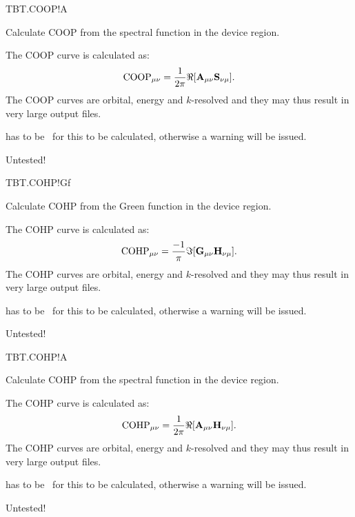 \begin{fdflogicalF}{TBT.COOP!A}

  Calculate COOP from the spectral function in the device region.

  The COOP curve is calculated as:
  \begin{equation}
    \label{eq:COOP-A}
    \mathrm{COOP}_{\mu\nu} = \frac{1}{2\pi}\Re[\mathbf A_{\mu\nu} \mathbf{S}_{\nu\mu}].
  \end{equation}
  The COOP curves are orbital, energy and $k$-resolved and they may
  thus result in very large output files.

  \note {} has to be \fdftrue\ for this to be
  calculated, otherwise a warning will be issued.

  \note Untested!

\end{fdflogicalF}

\begin{fdflogicalF}{TBT.COHP!Gf}

  Calculate COHP from the Green function in the device region.

  The COHP curve is calculated as:
  \begin{equation}
    \label{eq:COHP-Gf}
    \mathrm{COHP}_{\mu\nu} = \frac{-1}\pi\Im[\mathbf G_{\mu\nu} \mathbf{H}_{\nu\mu}].
  \end{equation}
  The COHP curves are orbital, energy and $k$-resolved and they may
  thus result in very large output files.

  \note {} has to be \fdftrue\ for this to be
  calculated, otherwise a warning will be issued.

  \note Untested!

\end{fdflogicalF}

\begin{fdflogicalF}{TBT.COHP!A}

  Calculate COHP from the spectral function in the device region.

  The COHP curve is calculated as:
  \begin{equation}
    \label{eq:COHP-A}
    \mathrm{COHP}_{\mu\nu} = \frac{1}{2\pi}\Re[\mathbf A_{\mu\nu} \mathbf{H}_{\nu\mu}].
  \end{equation}
  The COHP curves are orbital, energy and $k$-resolved and they may
  thus result in very large output files.

  \note {} has to be \fdftrue\ for this to be
  calculated, otherwise a warning will be issued.

  \note Untested!

\end{fdflogicalF}



